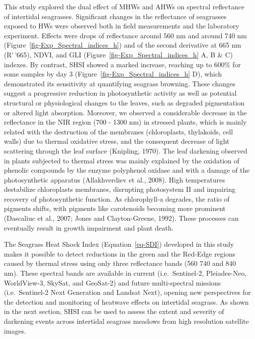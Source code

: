 \documentclass[
  letterpaper,
  11pt,
  english,
  singlespacing,
  headsepline]{MastersDoctoralThesis}
\begin{document}
\begin{spacing}{1.5}
This study explored the dual effect of MHWs and AHWs on spectral
reflectance of intertidal seagrasses. Significant changes in the
reflectance of seagrasses exposed to HWs were observed both in field
measurements and the laboratory experiment. Effects were drops of
reflectance around 560 nm and around 740 nm
(Figure~\ref{fig-Exp_Spectral_indices_h}) and of the second derivative
at 665 nm (R'\,'665), NDVI, and GLI
(Figure~\ref{fig-Exp_Spectral_indices_h} A, B \& C) indexes. By
contrast, SHSI showed a marked increase, reaching up to 600\% for some
samples by day 3 (Figure~\ref{fig-Exp_Spectral_indices_h} D), which
demonstrated its sensitivity at quantifying seagrass browning. These
changes suggest a progressive reduction in photosynthetic activity as
well as potential structural or physiological changes to the leaves,
such as degraded pigmentation or altered light absorption. Moreover, we
observed a considerable decrease in the reflectance in the NIR region
(700 - 1300 nm) in stressed plants, which is mainly related with the
destruction of the membranes (chloroplasts, thylakoids, cell walls) due
to thermal oxidative stress, and the consequent decrease of light
scattering through the leaf surface (Knipling, 1970). The leaf darkening
observed in plants subjected to thermal stress was mainly explained by
the oxidation of phenolic compounds by the enzyme polyphenol oxidase and
with a damage of the photosynthetic apparatus (Allakhverdiev et al.,
2008). High temperatures destabilize chloroplasts membranes, disrupting
photosystem II and impairing recovery of photosynthetic function. As
chlorophyll-a degrades, the ratio of pigments shifts, with pigments like
carotenoids becoming more prominent (Dascaliuc et al., 2007; Jones and
Clayton-Greene, 1992). These processes can eventually result in growth
impairment and plant death.

The Seagrass Heat Shock Index (Equation~\ref{eq-SDI}) developed in this
study makes it possible to detect reductions in the green and the
Red-Edge regions caused by thermal stress using only three reflectance
bands (560 740 and 840 nm). These spectral bands are available in
current (i.e.~Sentinel-2, Pleiades-Neo, WorldView-3, SkySat, and
GeoSat-2) and future multi-spectral missions (i.e.~Sentinel-2 Next
Generation and Landsat Next), opening new perspectives for the detection
and monitoring of heatwave effects on intertidal seagrass. As shown in
the next section, SHSI can be used to assess the extent and severity of
darkening events across intertidal seagrass meadows from high resolution
satellite images.


\end{spacing}
\end{document}
